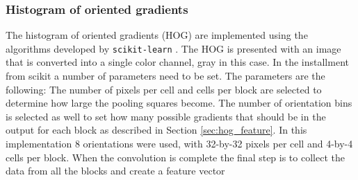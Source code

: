 \subsubsection{Histogram of oriented gradients}
\label{sec:meth:featextr:hog}

The histogram of oriented gradients (HOG) are implemented using the algorithms developed by \texttt{scikit-learn} \cite{scikitlearn}. The HOG is presented with an image that is converted into a single color channel, gray in this case. In the installment from scikit a number of parameters need to be set. The parameters are the following: The number of pixels per cell and cells per block are selected to determine how large the pooling squares become. The number of orientation bins is selected as well to set how many possible gradients that should be in the output for each block as described in Section \ref{sec:hog_feature}. In this implementation 8 orientations were used, with 32-by-32 pixels per cell and 4-by-4 cells per block. When the convolution is complete the final step is to collect the data from all the blocks and create a feature vector